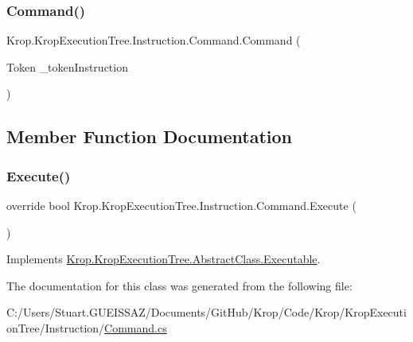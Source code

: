 \subsubsection{\texorpdfstring{Command()}{Command()}}
{\footnotesize\ttfamily Krop.\+Krop\+Execution\+Tree.\+Instruction.\+Command.\+Command (\begin{DoxyParamCaption}\item[{Token}]{\+\_\+token\+Instruction }\end{DoxyParamCaption})}



\subsection{Member Function Documentation}
\mbox{\label{class_krop_1_1_krop_execution_tree_1_1_instruction_1_1_command_ab0fc1d51e07e167cea0262e55e0de8af}} 
\subsubsection{\texorpdfstring{Execute()}{Execute()}}
{\footnotesize\ttfamily override bool Krop.\+Krop\+Execution\+Tree.\+Instruction.\+Command.\+Execute (\begin{DoxyParamCaption}{ }\end{DoxyParamCaption})\hspace{0.3cm}{\ttfamily [virtual]}}



Implements \mbox{\hyperlink{class_krop_1_1_krop_execution_tree_1_1_abstract_class_1_1_executable_ac32692ce44b5f938a90111ee27e7b684}{Krop.\+Krop\+Execution\+Tree.\+Abstract\+Class.\+Executable}}.



The documentation for this class was generated from the following file\+:\begin{DoxyCompactItemize}
\item 
C\+:/\+Users/\+Stuart.\+G\+U\+E\+I\+S\+S\+A\+Z/\+Documents/\+Git\+Hub/\+Krop/\+Code/\+Krop/\+Krop\+Execution\+Tree/\+Instruction/\mbox{\hyperlink{_command_8cs}{Command.\+cs}}\end{DoxyCompactItemize}
